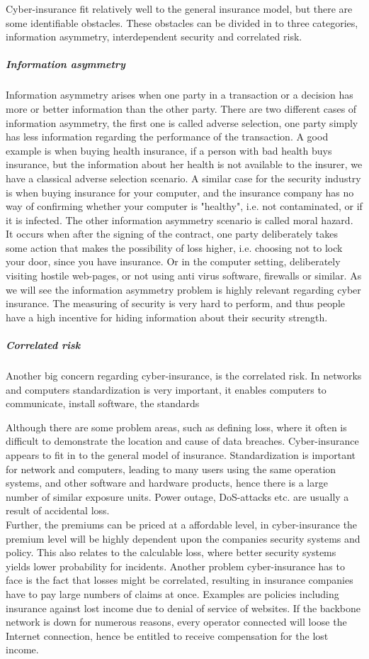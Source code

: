 Cyber-insurance fit relatively well to the general insurance model, but there are some identifiable obstacles. These obstacles can be divided in to three categories, information asymmetry, interdependent security and  correlated risk. 
\subparagraph{Information asymmetry}
Information asymmetry arises when one party in a transaction or a decision has more or better information than the other party. There are two different cases of information asymmetry, the first one is called adverse selection, one party simply has less information regarding the performance of the transaction. A good example is when buying health insurance, if a person with bad health buys insurance, but the information about her health is not available to the insurer, we have a classical adverse selection scenario. A similar case for the security industry is when buying insurance for your computer, and the insurance company has no way of confirming whether your computer is "healthy", i.e. not contaminated, or if it is infected. 
The other information asymmetry scenario is called moral hazard. It occurs when after the signing of the contract, one party deliberately takes some action that makes the possibility of loss higher, i.e. choosing not to lock your door, since you have insurance. Or in the computer setting, deliberately visiting hostile web-pages, or not using anti virus software, firewalls or similar. \cite{bohme2010modeling}
As we will see the information asymmetry problem is highly relevant regarding cyber insurance. The measuring of security is very hard to perform, and thus people have a high incentive for hiding information about their security strength. 
\subparagraph{Correlated risk}
Another big concern regarding cyber-insurance, is the correlated risk. In networks and computers standardization is very important, it enables computers to communicate, install software, the standards

    
 Although there are some problem areas, such as defining loss, where it often is difficult to demonstrate the location and cause of data breaches. Cyber-insurance appears to fit in to the general model of insurance. Standardization is important for network and computers, leading to many users using the same operation systems, and other software and hardware products, hence there is a large number of similar exposure units. Power outage, DoS-attacks etc. are usually a result of accidental loss.
 \\ Further, the premiums can be priced at a affordable level, in cyber-insurance the premium level will be highly dependent upon the companies security systems and policy. This also relates to the calculable loss, where better security systems yields lower probability for incidents. \cite{robinson2012incentives}
 Another problem cyber-insurance has to face is the fact that losses might be correlated, resulting in insurance companies have to pay large numbers of claims at once. Examples are policies including insurance against lost income due to denial of service of websites. If the backbone network is down for numerous reasons, every operator connected will loose the Internet connection, hence be entitled to receive compensation for the lost income.   
 
